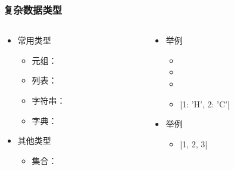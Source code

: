 \begin{CJK}{UTF8}{gbsn}
\begin{frame} [fragile]
	\frametitle{复杂数据类型}
	\linespread{2}
	\begin{columns}[T]
		\begin{column}[T]{.5\textwidth}
			\begin{itemize}
			\item 常用类型
				\begin{itemize}
				\item 元组：
				\item 列表：
				\item 字符串：
				\item 字典：
				\end{itemize}
			\item 其他类型
				\begin{itemize}
				\item 集合：
				\end{itemize}
			\end{itemize}
		\end{column}
		\begin{column}[T]{.5\textwidth}
			\begin{itemize}
			\item 举例
				\begin{itemize}
				\item {}
				\item {}
				\item {}
				\item \inlinePython|{1: 'H', 2: 'C'}|
				\end{itemize}
			\item 举例
				\begin{itemize}
				\item \inlinePython|{1, 2, 3}|
				\end{itemize}
			\end{itemize}
		\end{column}
	\end{columns}
\end{frame}


\end{CJK}
